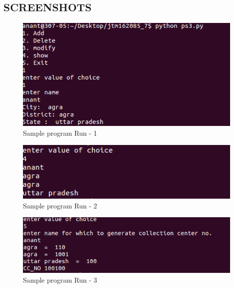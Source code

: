 \documentclass[11pt]{article}
\begin{document}
\begin{center}
\section{SCREENSHOTS}
\bigskip

\begin{figure}[h]
\includegraphics[scale=0.6]{PLAN1}
\centering
\caption{Sample program Run - 1}
\end{figure}
\end{center}
\begin{figure}[h]
\includegraphics[scale=0.6]{PLAN2}
\centering
\caption{Sample program Run - 2}
\end{figure}
\begin{figure}[h]
\includegraphics[scale=0.6]{PLAN3}
\centering
\caption{Sample program Run - 3}
\end{figure}
\newpage
\end{document}
